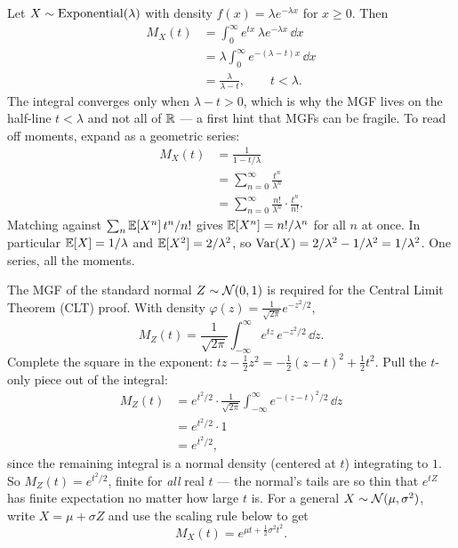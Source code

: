 \begin{example}
\label{ch18:ex-expo-mgf}
Let $X\sim\operatorname{Exponential}(\lambda)$ with density $f(x)=\lambda e^{-\lambda x}$ for
$x\ge 0$. Then
\begin{align*}
  M_X(t) &= \int_0^\infty e^{tx}\,\lambda e^{-\lambda x}\,\dd x \\
         &= \lambda\int_0^\infty e^{-(\lambda-t)x}\,\dd x \\
         &= \frac{\lambda}{\lambda - t}, \qquad t<\lambda .
\end{align*}
The integral converges only when $\lambda - t>0$, which is why the MGF lives on
the half-line $t<\lambda$ and not all of $\mathbb{R}$ --- a first hint that MGFs can be
fragile. To read off moments, expand as a geometric series:
\begin{align*}
  M_X(t) &= \frac{1}{1 - t/\lambda} \\
         &= \sum_{n=0}^\infty \frac{t^n}{\lambda^n} \\
         &= \sum_{n=0}^\infty \frac{n!}{\lambda^n}\cdot\frac{t^n}{n!}.
\end{align*}
Matching against $\sum_n \operatorname{\mathbb{E}}[X^n]\,t^n/n!$ gives $\operatorname{\mathbb{E}}[X^n]=n!/\lambda^n$ for all
$n$ at once. In particular $\operatorname{\mathbb{E}}[X]=1/\lambda$ and $\operatorname{\mathbb{E}}[X^2]=2/\lambda^2$, so
$\operatorname{Var}(X)=2/\lambda^2 - 1/\lambda^2 = 1/\lambda^2$. One series, all the moments.
\end{example}

\begin{example}
\label{ch18:ex-normal-mgf}
The MGF of the standard normal $Z\sim\mathcal{N}(0,1)$ is required for the Central Limit Theorem (CLT) proof. With density
$\varphi(z)=\frac{1}{\sqrt{2\pi}}e^{-z^2/2}$,
\[
  M_Z(t) = \frac{1}{\sqrt{2\pi}}\int_{-\infty}^\infty e^{tz}\,e^{-z^2/2}\,\dd z .
\]
Complete the square in the exponent: $tz - \tfrac12 z^2 = -\tfrac12(z-t)^2 +
\tfrac12 t^2$. Pull the $t$-only piece out of the integral:
\begin{align*}
  M_Z(t) &= e^{t^2/2}\cdot
           \frac{1}{\sqrt{2\pi}}\int_{-\infty}^\infty e^{-(z-t)^2/2}\,\dd z \\
         &= e^{t^2/2}\cdot 1 \\
         &= e^{t^2/2},
\end{align*}
since the remaining integral is a normal density (centered at $t$)
integrating to $1$. So $M_Z(t)=e^{t^2/2}$, finite for \emph{all} real $t$ ---
the normal's tails are so thin that $e^{tZ}$ has finite expectation no matter
how large $t$ is. For a general $X\sim\mathcal{N}(\mu,\sigma^2)$, write
$X=\mu+\sigma Z$ and use the scaling rule below to get
\[
  M_X(t) = e^{\mu t + \frac12 \sigma^2 t^2}.
\]
\end{example}


